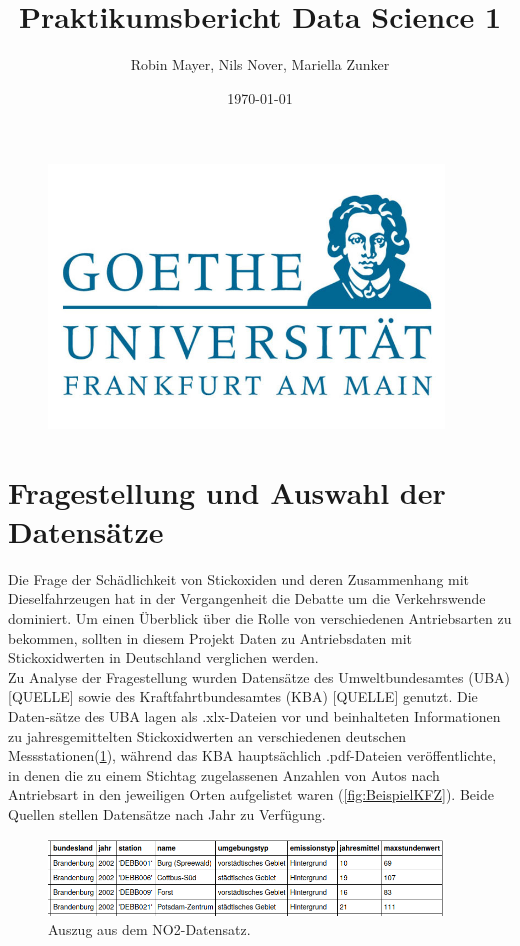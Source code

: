 \documentclass[11pt,a4paper,oneside,german]{article}
\title{Praktikumsbericht Data Science 1}
\author{Robin Mayer, Nils Nover, Mariella Zunker}
\date{\today}
\begin{document}
	\maketitle
	
	\begin{figure}[h]
		\centering
		\includegraphics[width=10.5cm]{uniemblem.jpg}		
	\end{figure}
	
	\newpage
	
	\tableofcontents
	
	\section{Fragestellung und Auswahl der Datensätze}
	
	Die Frage der Schädlichkeit von Stickoxiden und deren Zusammenhang mit Dieselfahrzeugen hat in der Vergangenheit die Debatte um die Verkehrswende dominiert. Um einen Überblick über die Rolle von verschiedenen Antriebsarten zu bekommen, sollten in diesem Projekt Daten zu Antriebsdaten mit Stickoxidwerten in Deutschland verglichen werden. \\
	Zu Analyse der Fragestellung wurden Datensätze des Umweltbundesamtes (UBA) [QUELLE] sowie des Kraftfahrtbundesamtes (KBA) [QUELLE] genutzt. Die Daten-sätze des UBA lagen als .xlx-Dateien vor und beinhalteten Informationen zu jahresgemittelten Stickoxidwerten an verschiedenen deutschen Messstationen(\ref{fig:BeispielNO2}), während das KBA hauptsächlich .pdf-Dateien veröffentlichte, in denen die zu einem Stichtag zugelassenen Anzahlen von Autos nach Antriebsart in den jeweiligen Orten aufgelistet waren (\ref{fig:BeispielKFZ}). Beide Quellen stellen Datensätze nach Jahr zu Verfügung.
	
	\begin{figure}[h!]
		\centering
		\includegraphics[width=10.5cm]{BeispielNO2.png}
		\caption{Auszug aus dem NO2-Datensatz.}
		\label{fig:BeispielNO2}
	\end{figure}
	
\end{document}
